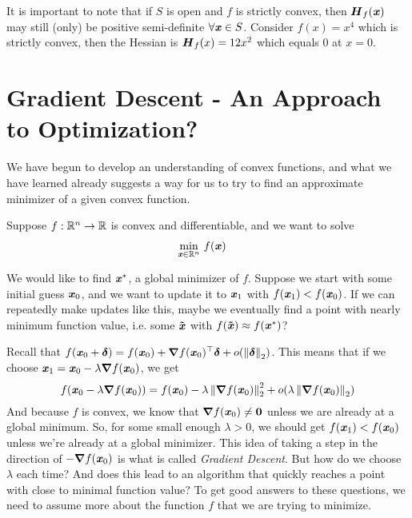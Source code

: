 \begin{remark}
It is important to note that if $S$ is open and $f$ is strictly
convex, then $\boldsymbol{{H}}_{f}(\boldsymbol{\mathit{x}})$ may still (only) be positive semi-definite
$\forall \boldsymbol{\mathit{x}} \in S$. Consider $f(x) = x^4$ which is strictly convex,
then the Hessian is $\boldsymbol{{H}}_{f}(x) = 12x^2$ which equals 0 at $x = 0$.
\end{remark}

\section{Gradient Descent - An Approach to Optimization?}

We have begun to develop an understanding of convex functions, and
what we have learned already suggests a way for us to try to find an
approximate minimizer of a given convex function.

Suppose $f : \mathbb{R}^n \to \mathbb{R}$ is convex and differentiable, and we want to
solve
\begin{align*}
\min_{\boldsymbol{\mathit{x}} \in \mathbb{R}^n} & \ f(\boldsymbol{\mathit{x}})
\end{align*}

We would like to find $\boldsymbol{\mathit{x}}^*$, a global minimizer of $f$.
Suppose we start with some initial guess  $\boldsymbol{\mathit{x}}_0$,
and we want to update it to $\boldsymbol{\mathit{x}}_1$ with $f(\boldsymbol{\mathit{x}}_1) < f(\boldsymbol{\mathit{x}}_0)$.
If we can repeatedly make updates like this, maybe we eventually
find a point with nearly minimum function value, i.e. some $\boldsymbol{\tilde{\mathit{x}}}$ with $f(\boldsymbol{\tilde{\mathit{x}}}) \approx f(\boldsymbol{\mathit{x}}^*)$?

Recall that $f(\boldsymbol{\mathit{x}}_0+\boldsymbol{\delta}) = f(\boldsymbol{\mathit{x}}_0) + \boldsymbol{\nabla} f(\boldsymbol{\mathit{x}}_0)^\top\boldsymbol{\delta} +
o(\left\| \boldsymbol{\delta} \right\|_2)$.
This means that if we choose
${\boldsymbol{\mathit{x}}_1 = \boldsymbol{\mathit{x}}_0 - \lambda \boldsymbol{\nabla} f(\boldsymbol{\mathit{x}}_0)}$, we get
\[
  f(\boldsymbol{\mathit{x}}_0 - \lambda \boldsymbol{\nabla} f(\boldsymbol{\mathit{x}}_0)) =
  f(\boldsymbol{\mathit{x}}_0) -\lambda \left\| \boldsymbol{\nabla} f(\boldsymbol{\mathit{x}}_0) \right\|_2^2 + o(\lambda \left\| \boldsymbol{\nabla} f(\boldsymbol{\mathit{x}}_0) \right\|_2)
\]
And because $f$ is convex, we know that $\boldsymbol{\nabla} f(\boldsymbol{\mathit{x}}_0) \neq \boldsymbol{0}$
unless we are already at a global minimum.
So, for some small enough $\lambda > 0$, we should get $f(\boldsymbol{\mathit{x}}_1) <
f(\boldsymbol{\mathit{x}}_0)$ unless we're already at a global minimizer.
This idea of taking a step in the direction of $-\boldsymbol{\nabla} f(\boldsymbol{\mathit{x}}_0)$ is
what is called \emph{Gradient Descent}.
But how do we choose $\lambda$ each time? And
does this lead to an algorithm that quickly reaches a point with close to minimal function value?
To get good answers to these questions, we need to assume more about
the function $f$ that we are trying to minimize.

